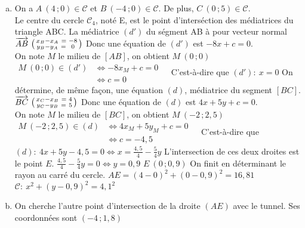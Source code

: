 \documentclass[12pt, a4paper]{article}
\begin{document}
    \begin{Exercise}[number={81}]
        \begin{enumerate}[a)]
            \item	On a $A\ (4\,;0)\in\mathcal{C}$ et $B\ (-4\,;0)\in\mathcal{C}$. De plus, $C\ (0\,;5)\in\mathcal{C}$. \\ Le centre du cercle $\mathcal{C}_4$, noté E, est le point d'interséction des médiatrices du triangle ABC. \medbreak
                    La médiatrice $(d')$ du ségment AB à pour vecteur normal \smallbreak
                    $\overrightarrow{AB}\ \begin{psmallmatrix}x_B-x_A\ =& -8 \\ y_B-y_A\ =& 0\end{psmallmatrix}$ \quad Donc une équation de $(d')$ est $-8x+c=0$. \\ On note $M$ le milieu de $[AB]$, on obtient $M\ (0\,;0)$ \smallbreak
                    $\begin{aligned}
                        M\ (0\,;0)\in (d')&\iff -8x_M+c=0 &\\
                        &\iff c=0
                    \end{aligned}$ \smallbreak C'est-à-dire que $(d'):\ x=0$ \bigbreak 
                    On détermine, de même façon, une équation $(d)$, médiatrice du segment $[BC]$. \smallbreak
                    $\overrightarrow{BC}\ \begin{psmallmatrix}x_C-x_B\ =& 4 \\ y_C-y_B\ =& 5\end{psmallmatrix}$ \quad Donc une équation de $(d)$ est $4x+5y+c=0$. \\ On note $M$ le milieu de $[BC]$, on obtient $M\ (-2\,;2{,}5)$ \smallbreak
                    $\begin{aligned}
                        M\ (-2\,;2{,}5)\in (d)&\iff 4x_M+5y_M+c=0 &\\
                        &\iff c=-4{,}5
                    \end{aligned}$ \smallbreak C'est-à-dire que $(d):\ 4x+5y-4{,}5=0\iff x=\frac{4{,}5}{4}-\frac{5}{4}y$ \bigbreak
                    L'intersection de ces deux droites est le point $E$. \smallbreak
                    $\frac{4{,}5}{4}-\frac{5}{4}y=0\iff y=0{,}9$ \smallbreak $E\ (0\,;0{,}9)$ \bigbreak
                    On finit en déterminant le rayon au carré du cercle. \smallbreak
                    $AE=(4-0)^2+(0-0{,}9)^2=16{,}81$ \bigbreak
                    $\mathcal{C}:\ x^2+(y-0{,}9)^2=4{,}1^2$
            \item   On cherche l'autre point d'intersection de la droite $(AE)$ avec le tunnel. Ses coordonnées sont $(-4\,;1{,}8)$
        \end{enumerate}
    \end{Exercise}
\end{document}
